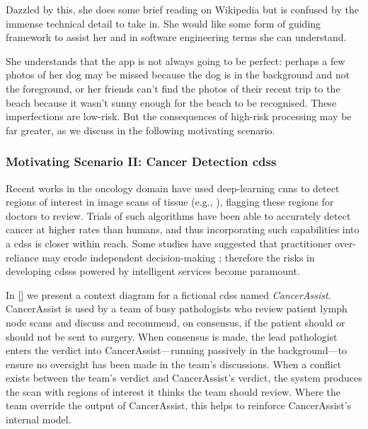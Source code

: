 Dazzled by this, she does some brief reading on Wikipedia but is confused by the immense technical detail to take in. She would like some form of guiding framework to assist her and in software engineering terms she can understand.

She understands that the app is not always going to be perfect: perhaps a few photos of her dog may be missed because the dog is in the background and not the foreground, or her friends can't find the photos of their recent trip to the beach because it wasn't sunny enough for the beach to be recognised. These imperfections are low-risk. But the consequences of high-risk processing may be far greater, as we discuss in the following motivating scenario.


\subsubsection{Motivating Scenario II: Cancer Detection \gls{cdss}}
\label{ssec:introduction:motivation:scenario:cancer}

Recent works in the oncology domain have used deep-learning \glspl{cnn} to detect regions of interest in image scans of tissue (e.g., \citep{Liu:2018fa,Haenssle:2018bz,EhteshamiBejnordi:2017kq}), flagging these regions for doctors to review. Trials of such algorithms have been able to accurately detect cancer at higher rates than humans, and thus incorporating such capabilities into a \gls{cdss} is closer within reach. Some studies have suggested that practitioner over-reliance may erode independent decision-making \citep{Jaspers:2011hy,Chambers:1991uh}; therefore the risks in developing \glspl{cdss} powered by intelligent services become paramount.

In \cref{} we present a context diagram for a fictional \gls{cdss} named \textit{CancerAssist}. CancerAssist is used by a team of busy pathologists who review patient lymph node scans and discuss and recommend, on consensus, if the patient should or should not be sent to surgery. When consensus is made, the lead pathologist enters the verdict into CancerAssist---running passively in the background---to ensure no oversight has been made in the team's discussions. When a conflict exists between the team's verdict and CancerAssist's verdict, the system produces the scan with regions of interest it thinks the team should review. Where the team override the output of CancerAssist, this helps to reinforce CancerAssist's internal model.

